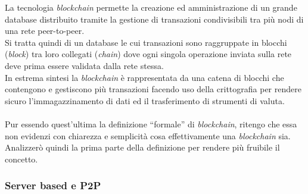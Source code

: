 \documentclass[11pt]{thesistemp}
\begin{document}
La tecnologia \textit{blockchain} permette la creazione ed amministrazione di un grande database distribuito tramite la gestione di transazioni condivisibili tra più nodi di una rete peer-to-peer.\\
Si tratta quindi di un database le cui transazioni sono raggruppate in blocchi (\textit{block}) tra loro collegati (\textit{chain}) dove ogni singola operazione inviata sulla rete deve prima essere validata dalla rete stessa.\\
In estrema sintesi la \textit{blockchain} è rappresentata da una catena di blocchi che contengono e gestiscono più transazioni facendo uso della crittografia per rendere sicuro l’immagazzinamento di dati ed il trasferimento di strumenti di valuta.\\\\
Pur essendo quest'ultima la definizione ``formale'' di \textit{blockchain}, ritengo che essa non evidenzi con chiarezza e semplicità cosa effettivamente una \textit{blockchain} sia.\\
Analizzerò quindi la prima parte della definizione per rendere più fruibile il concetto.

\subsubsection{Server based e P2P}
\end{document}
